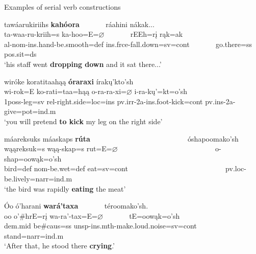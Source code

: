 \begin{exe}
    \item\label{Ch5ExSerialVerbs} Examples of serial verb constructions

    \begin{xlist}
        \item\label{Ch5ExSerialVerbsA} \glll tawáarukiriihs \textbf{kahóora} ~ ~ ~ ~ ráahini nákak...\\
        ta-waa-ru-kriih=s ka-hoo=E=$\varnothing$ ~ ~ ~ ~ rEEh=rį rąk=ak\\
        al-nom-ins.hand-\textnormal{be.smooth}=def ins.frce-\textnormal{fall.down}=sv=cont ~ ~ ~ ~ \textnormal{go.there}=ss pos.sit=ds\\
        \glt `his staff went \textbf{dropping down} and it sat there...' \citep[1]{hollow1973a}

        \item\label{Ch5ExSerialVerbsB} \glll wiróke koratitaahąą \textbf{óraraxi} írakų'kto'sh\\
        wi-rok=E ko-rati=taa=hąą o-ra-ra-xi=$\varnothing$ i-ra-kų'=kt=o'sh\\
        1poss-\textnormal{leg}=sv rel-\textnormal{right.side}=loc=ins pv.irr-2a-ins.foot-\textnormal{kick}=cont pv.ins-2a-\textnormal{give}=pot=ind.m\\
        \glt `you will pretend \textbf{to kick} my leg on the right side' \citep[62]{hollow1973b}

        \item\label{Ch5ExSerialVerbsC} \glll máareksuks máaskaps \textbf{rúta} ~ ~ ~ ~ ~ ~ ~ ~ ~ ~ ~ ~ ~ ~ ~ ~ óshapoomako'sh\\
        wąąreksuk=s wąą-skap=s rut=E=$\varnothing$ ~ ~ ~ ~ ~ ~ ~ ~ ~ ~ ~ ~ ~ ~ ~ ~ o-shap=oowąk=o'sh\\
        \textnormal{bird}=def nom-\textnormal{be.wet}=def \textnormal{eat}=sv=cont ~ ~ ~ ~ ~ ~ ~ ~ ~ ~ ~ ~ ~ ~ ~ ~ pv.loc-\textnormal{be.lively}=narr=ind.m\\
        \glt `the bird was rapidly \textbf{eating} the meat' \citep[132]{hollow1973a}

        \item\label{Ch5ExSerialVerbsD} \glll Óo ó'harani \textbf{wará'taxa} ~ ~ ~ ~ téroomako'sh.\\
        oo o'\#hrE=rį wa-ra'-tax=E=$\varnothing$ ~ ~ ~ ~ tE=oowąk=o'sh\\
        dem.mid \textnormal{be}\#caus=ss unsp-ins.mth-\textnormal{make.loud.noise}=sv=cont ~ ~ ~ ~ \textnormal{stand}=narr=ind.m\\
        \glt `After that, he stood there \textbf{crying}.' \citep[270]{hollow1970}

    \end{xlist}
\end{exe}

